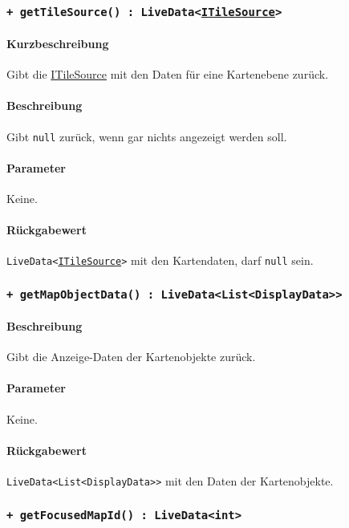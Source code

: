 \subsubsection*{\texttt{+ getTileSource() : LiveData<\href{https://osmdroid.github.io/osmdroid/javadocAll/org/osmdroid/tileprovider/tilesource/ITileSource.html}{ITileSource}>}}%
\paragraph*{Kurzbeschreibung}
Gibt die \href{https://osmdroid.github.io/osmdroid/javadocAll/org/osmdroid/tileprovider/tilesource/ITileSource.html}
{ITileSource} mit den Daten für eine Kartenebene zurück.
\paragraph*{Beschreibung}
Gibt \texttt{null} zurück, wenn gar nichts angezeigt werden soll.
\paragraph*{Parameter}
Keine.
\paragraph*{Rückgabewert}
\texttt{LiveData<\href{https://osmdroid.github.io/osmdroid/javadocAll/org/osmdroid/tileprovider/tilesource/ITileSource.html}
{ITileSource}>} mit den Kartendaten, darf \texttt{null} sein.

\subsubsection*{\texttt{+ getMapObjectData() : LiveData<List<DisplayData>>}}%
\paragraph*{Beschreibung}
Gibt die Anzeige-Daten der Kartenobjekte zurück.
\paragraph*{Parameter}
Keine.
\paragraph*{Rückgabewert}
\texttt{LiveData<List<DisplayData>>} mit den Daten der Kartenobjekte.

\subsubsection*{\texttt{+ getFocusedMapId() : LiveData<int>}}%
